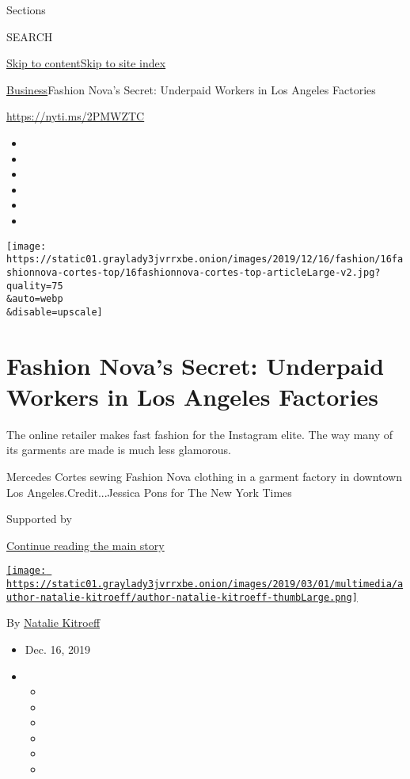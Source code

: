 Sections

SEARCH

\protect\hyperlink{site-content}{Skip to
content}\protect\hyperlink{site-index}{Skip to site index}

\href{/section/business}{Business}\textbar{}Fashion Nova's Secret:
Underpaid Workers in Los Angeles Factories

\href{https://nyti.ms/2PMWZTC}{https://nyti.ms/2PMWZTC}

\begin{itemize}
\item
\item
\item
\item
\item
\item
\end{itemize}

\texttt{[image: https://static01.graylady3jvrrxbe.onion/images/2019/12/16/fashion/16fashionnova-cortes-top/16fashionnova-cortes-top-articleLarge-v2.jpg?quality=75\\\&auto=webp\\\&disable=upscale]}

\hypertarget{fashion-novas-secret-underpaid-workers-in-los-angeles-factories}{%
\section{Fashion Nova's Secret: Underpaid Workers in Los Angeles
Factories}\label{fashion-novas-secret-underpaid-workers-in-los-angeles-factories}}

The online retailer makes fast fashion for the Instagram elite. The way
many of its garments are made is much less glamorous.

Mercedes Cortes sewing Fashion Nova clothing in a garment factory in
downtown Los Angeles.Credit...Jessica Pons for The New York Times

Supported by

\protect\hyperlink{after-sponsor}{Continue reading the main story}

\href{https://www.nytimes3xbfgragh.onion/by/natalie-kitroeff}{\texttt{[image: https://static01.graylady3jvrrxbe.onion/images/2019/03/01/multimedia/author-natalie-kitroeff/author-natalie-kitroeff-thumbLarge.png]}}

By \href{https://www.nytimes3xbfgragh.onion/by/natalie-kitroeff}{Natalie
Kitroeff}

\begin{itemize}
\item
  Dec. 16, 2019
\item
  \begin{itemize}
  \item
  \item
  \item
  \item
  \item
  \item
  \end{itemize}
\end{itemize}

